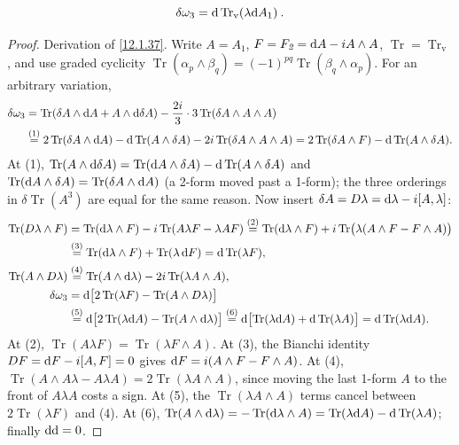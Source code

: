 \begin{equation}
	\delta \omega_3 = \mathrm{d} \operatorname{Tr}_{\text{v}} (\lambda \mathrm{d} A_1) \:. \label{12.1.37}
\end{equation}
\begin{tcolorbox}[breakable]
	\begin{proof}
		Derivation of \eqref{12.1.37}. Write $A=A_{\textit{1}}$, $F=F_{\textit{2}}=\mathrm{d} A-i A\wedge A$, $\operatorname{Tr}=\operatorname{Tr}_{\text{v}}$, and use graded cyclicity $\operatorname{Tr}(\alpha_{p}\wedge\beta_{q})=(-1)^{pq}\operatorname{Tr}(\beta_{q}\wedge\alpha_{p})$. For an arbitrary variation,
		\begin{align*}
			\delta\omega_{3}&=\operatorname{Tr}(\delta A\wedge\mathrm{d} A+A\wedge\mathrm{d}\delta A)-\frac{2i}{3}\cdot3\operatorname{Tr}(\delta A\wedge A\wedge A)\\
			&\overset{(1)}{=} 2\operatorname{Tr}(\delta A\wedge\mathrm{d} A)-\mathrm{d}\operatorname{Tr}(A\wedge\delta A)-2i\operatorname{Tr}(\delta A\wedge A\wedge A)
			=2\operatorname{Tr}(\delta A\wedge F)-\mathrm{d}\operatorname{Tr}(A\wedge\delta A) .
		\end{align*}
		At (1), $\operatorname{Tr}(A\wedge\mathrm{d}\delta A)=\operatorname{Tr}(\mathrm{d} A\wedge\delta A)-\mathrm{d}\operatorname{Tr}(A\wedge\delta A)$ and $\operatorname{Tr}(\mathrm{d} A\wedge\delta A)=\operatorname{Tr}(\delta A\wedge\mathrm{d} A)$ (a 2-form moved past a 1-form); the three orderings in $\delta\operatorname{Tr}(A^{3})$ are equal for the same reason. Now insert $\delta A=D\lambda=\mathrm{d}\lambda-i[A,\lambda]$:
		\begin{align*}
			\operatorname{Tr}(D\lambda\wedge F)
			&=\operatorname{Tr}(\mathrm{d}\lambda\wedge F)-i\operatorname{Tr}(A\lambda F-\lambda AF)
			\overset{(2)}{=} \operatorname{Tr}(\mathrm{d}\lambda\wedge F)+i\operatorname{Tr}\bigl(\lambda(A\wedge F-F\wedge A)\bigr)\\
			&\overset{(3)}{=} \operatorname{Tr}(\mathrm{d}\lambda\wedge F)+\operatorname{Tr}(\lambda\,\mathrm{d} F)=\mathrm{d}\operatorname{Tr}(\lambda F),\\
			\operatorname{Tr}(A\wedge D\lambda)
			&\overset{(4)}{=} \operatorname{Tr}(A\wedge\mathrm{d}\lambda)-2i\operatorname{Tr}(\lambda A\wedge A),\\
			\delta\omega_{3}&=\mathrm{d}\bigl[2\operatorname{Tr}(\lambda F)-\operatorname{Tr}(A\wedge D\lambda)\bigr]\\
			&\overset{(5)}{=} \mathrm{d}\bigl[2\operatorname{Tr}(\lambda\mathrm{d} A)-\operatorname{Tr}(A\wedge\mathrm{d}\lambda)\bigr]
			\overset{(6)}{=} \mathrm{d}\bigl[\operatorname{Tr}(\lambda\mathrm{d} A)+\mathrm{d}\operatorname{Tr}(\lambda A)\bigr]
			=\mathrm{d}\operatorname{Tr}(\lambda\mathrm{d} A) .
		\end{align*}
		At (2), $\operatorname{Tr}(A\lambda F)=\operatorname{Tr}(\lambda F\wedge A)$. At (3), the Bianchi identity $DF=\mathrm{d} F-i[A,F]=0$ gives $\mathrm{d} F=i(A\wedge F-F\wedge A)$. At (4), $\operatorname{Tr}(A\wedge A\lambda-A\lambda A)=2\operatorname{Tr}(\lambda A\wedge A)$, since moving the last 1-form $A$ to the front of $A\lambda A$ costs a sign. At (5), the $\operatorname{Tr}(\lambda A\wedge A)$ terms cancel between $2\operatorname{Tr}(\lambda F)$ and (4). At (6), $\operatorname{Tr}(A\wedge\mathrm{d}\lambda)=-\operatorname{Tr}(\mathrm{d}\lambda\wedge A)=\operatorname{Tr}(\lambda\mathrm{d} A)-\mathrm{d}\operatorname{Tr}(\lambda A)$; finally $\mathrm{d}\mathrm{d}=0$.


\end{proof}
\end{tcolorbox}
